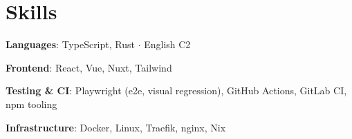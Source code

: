 \documentclass[11pt,a4paper]{article}
\begin{document}
\section*{Skills}

\noindent\textbf{Languages}: TypeScript, Rust $\cdot$ English C2

\noindent\textbf{Frontend}: React, Vue, Nuxt, Tailwind

\noindent\textbf{Testing \& CI}: Playwright (e2e, visual regression), GitHub Actions, GitLab CI, npm tooling

\noindent\textbf{Infrastructure}: Docker, Linux, Traefik, nginx, Nix
\end{document}
